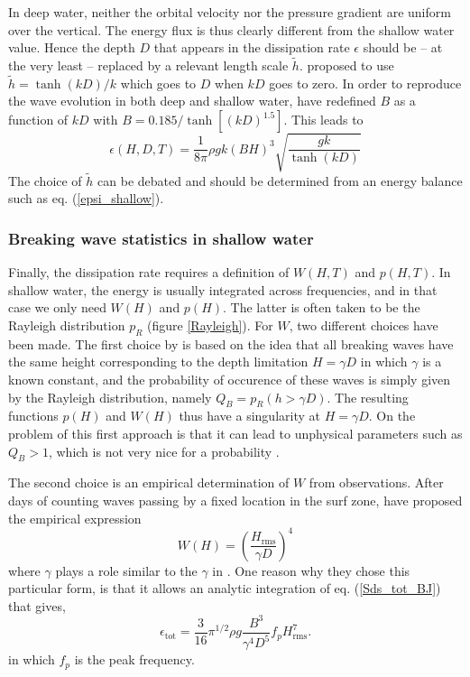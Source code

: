 In deep water, neither the orbital velocity nor the pressure gradient are uniform over the vertical. 
The energy flux is thus clearly different from the shallow water value. 
Hence the depth $D$ that appears in the dissipation rate $\epsilon$ should be -- at the very least -- replaced by a relevant length scale $\widetilde{h}$. 
\cite{Chawla&Kirby2002} proposed to use $\widetilde{h}=\tanh(kD)/k$  which goes to $D$ when $kD$  goes to zero. In order to reproduce the wave evolution 
in both deep and shallow water, \cite{Filipot&al.2010b} have redefined  $B$ as a function of $kD$ with $B=0.185 / \tanh[(kD)^{1.5}]$. 
This leads to 
\begin{equation}
    \epsilon(H,D,T) = \frac{1}{8 \pi} \rho g k \left(B H \right)^3 \sqrt{\frac{gk}{\tanh(kD)}} \label{eps_CK2002}
\end{equation}
The choice of  $\widetilde{h}$  can be debated and should be determined from an energy balance such as  eq. (\ref{epsi_shallow}). 



\subsubsection{Breaking wave statistics in shallow water\label{TG1983}}
Finally, the dissipation rate requires a definition of  $W(H,T)$ and $p\left(H,T\right)$. 
In shallow water, the energy is usually integrated across frequencies, and  in that case we only need $W(H)$ and $p\left(H\right)$. The latter is often taken to be the Rayleigh distribution $p_R$ (figure \ref{Rayleigh}). 
For $W$, two different choices have been made. The first choice by \cite{Battjes&Janssen1978} 
is based on the idea that all breaking waves have the same height corresponding to the depth limitation  
$H=\gamma  D$ in which $\gamma$ is a known constant, and the probability of occurence of these waves is simply given by the Rayleigh distribution, namely 
$Q_B=p_R(h > \gamma D)$. The resulting functions $p(H)$ and $W(H)$ thus have a singularity at $H= \gamma D$. On the problem of this first approach is 
that it can lead to unphysical parameters such as $Q_B > 1$, which is not very nice for a probability 
\citep{Janssen&Battjes2006}. 

The second choice is an empirical determination of  $W$  from observations. After days of counting waves passing by a fixed location in the surf zone, 
\cite{Thornton&Guza1983} have proposed the empirical expression
\begin{equation}
    W(H)=\left(\frac{H_{\mathrm{rms}}}{\gamma D}\right)^4
\end{equation}
where $\gamma$ plays a role similar to the $\gamma$ in  \cite{Battjes&Janssen1978}. One reason why they chose this particular form, is that it allows an analytic 
integration of eq. (\ref{Sds_tot_BJ}) that gives,
\begin{equation}
    \epsilon_{\mathrm{tot}} = \frac{3}{16} \pi^{1/2} \rho g \frac{B^3}{\gamma^4 D^5}f_p
    H_{\mathrm{rms}}^7.
\end{equation}
in which $f_p$ is the peak frequency. 

